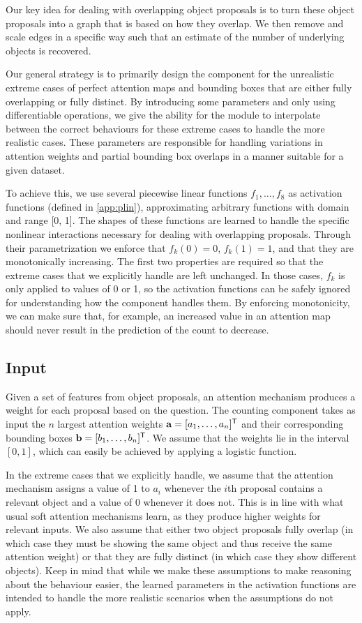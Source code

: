 \documentclass[letterpaper]{article}
\newcommand{\m}[1]{\mathbf{#1}}
\begin{document}
Our key idea for dealing with overlapping object proposals is to turn these object proposals into a graph that is based on how they overlap.
We then remove and scale edges in a specific way such that an estimate of the number of underlying objects is recovered.

Our general strategy is to primarily design the component for the unrealistic extreme cases of perfect attention maps and bounding boxes that are either fully overlapping or fully distinct.
By introducing some parameters and only using differentiable operations, we give the ability for the module to interpolate between the correct behaviours for these extreme cases to handle the more realistic cases.
These parameters are responsible for handling variations in attention weights and partial bounding box overlaps in a manner suitable for a given dataset.

To achieve this, we use several piecewise linear functions $f_1, \ldots, f_8$ as activation functions (defined in \autoref{app:plin}), approximating arbitrary functions with domain and range [0, 1].
The shapes of these functions are learned to handle the specific nonlinear interactions necessary for dealing with overlapping proposals.
Through their parametrization we enforce that $f_k(0) = 0$, $f_k(1) = 1$, and that they are monotonically increasing.
The first two properties are required so that the extreme cases that we explicitly handle are left unchanged.
In those cases, $f_k$ is only applied to values of 0 or 1, so the activation functions can be safely ignored for understanding how the component handles them.
By enforcing monotonicity, we can make sure that, for example, an increased value in an attention map should never result in the prediction of the count to decrease.

\subsection{Input}
Given a set of features from object proposals, an attention mechanism produces a weight for each proposal based on the question.
The counting component takes as input the $n$ largest attention weights $\m a = [a_1, \ldots, a_n]^\T$ and their corresponding bounding boxes $\m b = [b_1, \ldots, b_n]^\T$.
We assume that the weights lie in the interval $[0, 1]$, which can easily be achieved by applying a logistic function.

In the extreme cases that we explicitly handle, we assume that the attention mechanism assigns a value of 1 to $a_i$ whenever the $i$th proposal contains a relevant object and a value of 0 whenever it does not.
This is in line with what usual soft attention mechanisms learn, as they produce higher weights for relevant inputs.
We also assume that either two object proposals fully overlap (in which case they must be showing the same object and thus receive the same attention weight) or that they are fully distinct (in which case they show different objects).
Keep in mind that while we make these assumptions to make reasoning about the behaviour easier, the learned parameters in the activation functions are intended to handle the more realistic scenarios when the assumptions do not apply.
\end{document}
